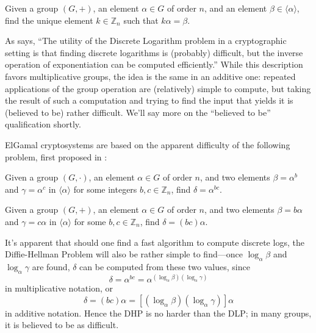 \begin{prob}
Given a group $(G, +)$, an element $\alpha \in G$ of order $n$, and an element
  $\beta \in \langle \alpha \rangle$, find the unique element $k \in
  \mathbb{Z}_n$ such that $k\alpha = \beta$.
  \end{prob}

As \cite{stinson2005cryptography} says, ``The utility of the Discrete Logarithm
    problem in a cryptographic setting is that finding discrete logarithms is
    (probably) difficult, but the inverse operation of exponentiation can be
    computed efficiently.''
While this description favors multiplicative groups, the idea is the same in an
    additive one: repeated applications of the group operation are (relatively)
    simple to compute, but taking the result of such a computation and trying
    to find the input that yields it is (believed to be) rather difficult.
We'll say more on the ``believed to be'' qualification shortly.

ElGamal cryptosystems are based on the apparent difficulty of the following
problem, first proposed in \cite{diffie1976new}:
\begin{prob}
Given a group $(G, \cdot)$, an element $\alpha \in G$ of order $n$, and two
  elements $\beta = \alpha^b$ and $\gamma = \alpha^c$ in $\langle \alpha
  \rangle$ for some integers $b, c \in \mathbb{Z}_n$, find $\delta =
  \alpha^{bc}$.
\end{prob}
\begin{prob}
Given a group $(G, +)$, an element $\alpha \in G$ of order $n$, and two
  elements $\beta = b \alpha$ and $\gamma = c \alpha$ in $\langle \alpha
  \rangle$ for some $b, c \in \mathbb{Z}_n$, find $\delta = (bc)\alpha$.

\end{prob}
It's apparent that should one find a fast algorithm to compute discrete logs,
    the Diffie-Hellman Problem will also be rather simple to find---once
    $\log_\alpha \beta$ and $\log_\alpha \gamma$ are found, $\delta$ can be
    computed from these two values, since
\[
\delta = \alpha^{bc} = \alpha^{(\log_\alpha \beta)(\log_\alpha \gamma)}
\]
    in multiplicative notation, or
\[
\delta = (bc)\alpha = [(\log_\alpha \beta)(\log_\alpha \gamma)]\alpha
\]
    in additive notation.
Hence the DHP is no harder than the DLP; in many groups, it is believed to be
    as difficult.

